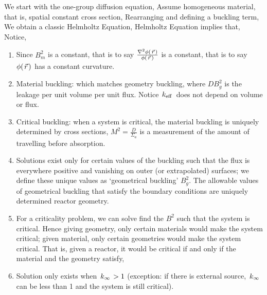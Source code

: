 \documentclass{school-22.211-notes}
\date{March 19, 2012}
\begin{document}
\maketitle

We start with the one-group diffusion equation,
Assume homogeneous material, that is, spatial constant cross section,
Rearranging and defining a buckling term, 
We obtain a classic Helmholtz Equation,
Helmholtz Equation implies that,
Notice,
\begin{enumerate}
\item Since $B_m^2$ is a constant, that is to say $\frac{\nabla^2 \phi(\left.\vec{r}\right.)}{\phi(\left.\vec{r}\right.)}$ is a constant, that is to say $\phi(\left.\vec{r}\right.)$ has a constant curvature. 
\item Material buckling: 
  which matches geometry buckling, 
  where $DB^2_g$ is the leakage per unit volume per unit flux. Notice $\left. k_{\mathrm{eff}} \right.$ does not depend on volume or flux. 

\item Critical buckling: when a system is critical, the material buckling is uniquely determined by cross sections, 
   $M^2 = \frac{D}{\Sigma_a}$ is a measurement of the amount of travelling before absorption. 


\item Solutions exist only for certain values of the buckling such that the flux is everywhere positive and vanishing on outer (or extrapolated) surfaces; we define these unique values as `geometrical buckling' $B_g^2$. The allowable values of geometrical buckling that satisfy the boundary conditions are uniquely determined reactor geometry.

\item For a criticality problem, we can solve find the $B^2$ such that the system is critical. Hence giving geometry, only certain materials would make the system critical; given material, only certain geometries would make the system critical. That is, given a reactor, it would be critical if and only if the material and the geometry satisfy,

\item Solution only exists when $\left. k_{\infty} \right. > 1$ (exception: if there is external source, $\left. k_{\infty} \right.$ can be less than 1 and the system is still critical). 


\end{enumerate}
\end{document}

